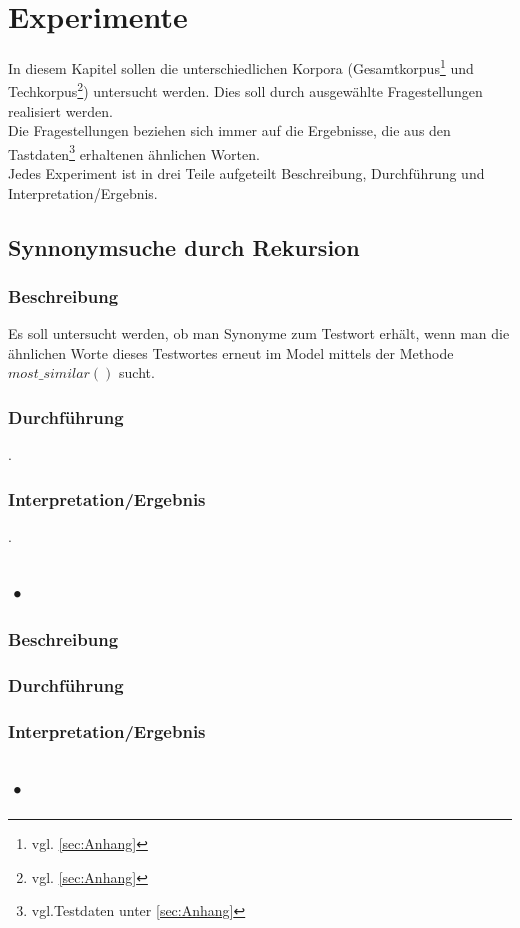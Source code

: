 \documentclass[12pt,a4paper]{article}
\begin{document}
\section{Experimente}
In diesem Kapitel sollen die unterschiedlichen Korpora (Gesamtkorpus\footnote{vgl. \ref{sec:Anhang}} und Techkorpus\footnote{vgl. \ref{sec:Anhang}}) untersucht werden. Dies soll durch ausgewählte Fragestellungen realisiert werden.
\\Die Fragestellungen beziehen sich immer auf die Ergebnisse, die aus den Tastdaten\footnote{vgl.Testdaten unter \ref{sec:Anhang}} erhaltenen ähnlichen Worten.
\\Jedes Experiment ist in drei Teile aufgeteilt Beschreibung, Durchführung und Interpretation/Ergebnis.
	\subsection{Synnonymsuche durch Rekursion}
		\subsubsection{Beschreibung}
		Es soll untersucht werden, ob man Synonyme zum Testwort erhält, wenn man die ähnlichen Worte dieses Testwortes erneut im Model mittels der Methode $most\_similar()$ sucht. 
		\subsubsection{Durchführung}
		.
		\subsubsection{Interpretation/Ergebnis}
		.
	\subsection{•}
		\subsubsection{Beschreibung}
		\subsubsection{Durchführung}
		\subsubsection{Interpretation/Ergebnis}
	\subsection{•}
\end{document}
